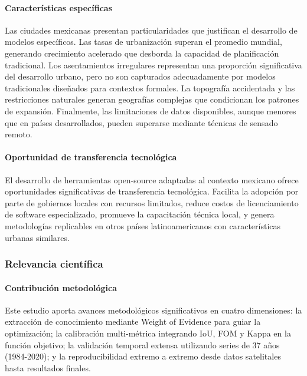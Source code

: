 \paragraph{Características específicas}

Las ciudades mexicanas presentan particularidades que justifican el desarrollo de modelos específicos. Las tasas de urbanización superan el promedio mundial, generando crecimiento acelerado que desborda la capacidad de planificación tradicional. Los asentamientos irregulares representan una proporción significativa del desarrollo urbano, pero no son capturados adecuadamente por modelos tradicionales diseñados para contextos formales. La topografía accidentada y las restricciones naturales generan geografías complejas que condicionan los patrones de expansión. Finalmente, las limitaciones de datos disponibles, aunque menores que en países desarrollados, pueden superarse mediante técnicas de sensado remoto.

\paragraph{Oportunidad de transferencia tecnológica}

El desarrollo de herramientas open-source adaptadas al contexto mexicano ofrece oportunidades significativas de transferencia tecnológica. Facilita la adopción por parte de gobiernos locales con recursos limitados, reduce costos de licenciamiento de software especializado, promueve la capacitación técnica local, y genera metodologías replicables en otros países latinoamericanos con características urbanas similares.

\subsubsection{Relevancia científica}

\paragraph{Contribución metodológica}

Este estudio aporta avances metodológicos significativos en cuatro dimensiones: la extracción de conocimiento mediante Weight of Evidence para guiar la optimización; la calibración multi-métrica integrando IoU, FOM y Kappa en la función objetivo; la validación temporal extensa utilizando series de 37 años (1984-2020); y la reproducibilidad extremo a extremo desde datos satelitales hasta resultados finales.


